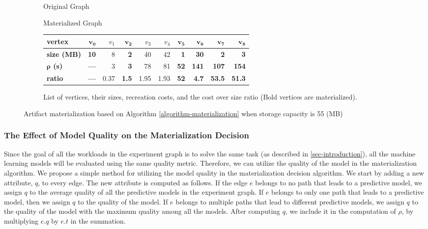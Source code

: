 \begin{figure}
\begin{subfigure}{0.5\linewidth}
\centering

\caption{Original Graph}
\end{subfigure}%
\begin{subfigure}{0.5\linewidth}
\centering

\caption{Materialized Graph}
\end{subfigure}
\begin{subfigure}{\linewidth}
\setlength\tabcolsep{3.5pt} %
\begin{tabular}{l | | >{\bfseries}r | r  |>{\bfseries}r | r | r | >{\bfseries}r | >{\bfseries}r | >{\bfseries}r |>{\bfseries}r }
\hline
\textbf{vertex} & $\boldsymbol{v_0}$ & $v_1$ & $\boldsymbol{v_2}$ & $v_3$ & $v_4$ & $\boldsymbol{v_5}$ & $\boldsymbol{v_6}$ & $\boldsymbol{v_7}$ &$\boldsymbol{v_8}$ \\
\hline
\textbf{size (MB)}    & 10 & 8 & 2 & 40 & 42 & 1 & 30 & 2   & 3        \\
\textbf{$\boldsymbol{\rho}$ (s)} & ---   & 3 & 3 & 78 & 81 & 52 & 141 & 107 & 154	  \\
\textbf{ratio}& ---   & 0.37 & 1.5 & 1.95 & 1.93 & 52 & 4.7 & 53.5 & 51.3	\\
\hline
\end{tabular}
\caption{List of vertices, their sizes, recreation costs, and the cost over size ratio (Bold vertices are materialized).}
\end{subfigure}
\caption{Artifact materialization based on Algorithm \ref{algorithm-materialization} when storage capacity is 55 (MB)}
\label{fig-materialization-example}
\end{figure}

\subsubsection{The Effect of Model Quality on the Materialization Decision}
Since the goal of all the workloads in the experiment graph is to solve the same task (as described in \ref{sec-introduction}), all the machine learning models will be evaluated using the same quality metric.
Therefore, we can utilize the quality of the model in the materialization algorithm.
We propose a simple method for utilizing the model quality in the materialization decision algorithm.
We start by adding a new attribute, $q$, to every edge.
The new attribute is computed as follows.
If the edge $e$ belongs to no path that leads to a predictive model, we assign $q$ to the average quality of all the predictive models in the experiment graph.
If $e$ belongs to only one path that leads to a predictive model, then we assign $q$ to the quality of the model.
If $e$ belongs to multiple paths that lead to different predictive models, we assign $q$ to the quality of the model with the maximum quality among all the models.
After computing $q$, we include it in the computation of $\rho$, by multiplying $e.q$ by $e.t$ in the summation. 


